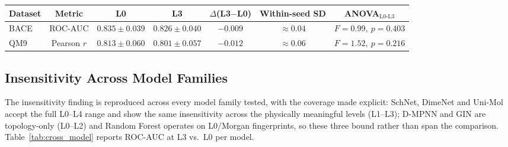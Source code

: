 \documentclass[pdflatex,sn-vancouver-num]{sn-jnl}%
\theoremstyle{thmstyleone}%
\theoremstyle{thmstyletwo}%
\theoremstyle{thmstylethree}%
\renewenvironment{table}[1][htbp]%
{\begin{tableorg}[#1]%
\begin{center}
\begin{adjustbox}{max width=\linewidth}
\begin{threeparttable}
\tablebodyfont%
\renewcommand\footnotetext[2][]{{\removelastskip\vskip3pt%
\let\tablebodyfont\tablefootnotefont%
\hskip0pt\if!##1!\else{\smash{$^{##1}$}}\fi##2\par}}%
}{\end{threeparttable}\end{adjustbox}\end{center}\end{tableorg}}
\begin{document}
\begin{table}[htbp]
  \centering
  \caption{Edge-connectivity decoupling.  At fixed connectivity ($\tau = 5.0$\,\AA), increasing ligand distance precision from a constant scalar (L0) to the true conformer (L3) yields a difference far below the between-seed standard deviation and non-significant in the restricted ANOVA (L0--L3).  Means and dispersion from Table~\ref{tab:main_results}; the connectivity-variation arm is reported in Appendix~\ref{app:sensitivity}.}
  \label{tab:decoupling}
  \renewcommand{\arraystretch}{1.25}
  \begin{tabular}{|l|c|c|c|c|c|c|}
    \hline
    \textbf{Dataset} & \textbf{Metric} & \textbf{L0} & \textbf{L3} & \textbf{$\Delta$(L3$-$L0)} & \textbf{Within-seed SD} & \textbf{ANOVA$_{\mathrm{L0\text{-}L3}}$} \\
    \hline
    BACE & ROC-AUC    & $0.835{\pm}0.039$ & $0.826{\pm}0.040$ & $-0.009$ & $\approx 0.04$ & $F{=}0.99,\ p{=}0.403$ \\
    \hline
    QM9  & Pearson $r$ & $0.813{\pm}0.060$ & $0.801{\pm}0.057$ & $-0.012$ & $\approx 0.06$ & $F{=}1.52,\ p{=}0.216$ \\
    \hline
  \end{tabular}
\end{table}

\subsection{Insensitivity Across Model Families}

The insensitivity finding is reproduced across every model family tested, with the coverage made explicit: SchNet, DimeNet and Uni-Mol accept the full L0--L4 range and show the same insensitivity across the physically meaningful levels (L1--L3); D-MPNN and GIN are topology-only (L0--L2) and Random Forest operates on L0/Morgan fingerprints, so these three bound rather than span the comparison.
Table~\ref{tab:cross_model} reports ROC-AUC at L3 vs.\ L0 per model.
\end{document}
